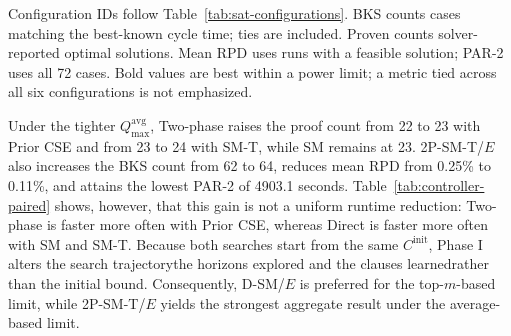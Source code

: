 \documentclass[]{interact}
\theoremstyle{plain}
\theoremstyle{definition}
\theoremstyle{remark}
\newcommand{\Cinit}{C^{\mathrm{init}}}
\begin{document}
\begin{table}[t!]
\begin{threeparttable}
\begin{tabular}{@{} l c c c c @{}}
\bottomrule
\end{tabular}
\begin{tablenotes}[flushleft]
\scriptsize
\item Configuration IDs follow Table~\ref{tab:sat-configurations}. BKS counts cases matching the best-known cycle time; ties are included. Proven counts solver-reported optimal solutions. Mean RPD uses runs with a feasible solution; PAR-2 uses all 72 cases. Bold values are best within a power limit; a metric tied across all six configurations is not emphasized.
\end{tablenotes}
\end{threeparttable}
\end{table}

Under the tighter $Q_{\max}^{\mathrm{avg}}$, Two-phase raises the proof count from 22 to 23 with Prior CSE and from 23 to 24 with SM-T, while SM remains at 23. 2P-SM-T/$E$ also increases the BKS count from 62 to 64, reduces mean RPD from 0.25\% to 0.11\%, and attains the lowest PAR-2 of 4903.1 seconds. Table~\ref{tab:controller-paired} shows, however, that this gain is not a uniform runtime reduction: Two-phase is faster more often with Prior CSE, whereas Direct is faster more often with SM and SM-T. Because both searches start from the same $\Cinit$, Phase I alters the search trajectory\textemdash{}the horizons explored and the clauses learned\textemdash{}rather than the initial bound. Consequently, D-SM/$E$ is preferred for the top-$m$-based limit, while 2P-SM-T/$E$ yields the strongest aggregate result under the average-based limit.
\end{document}
